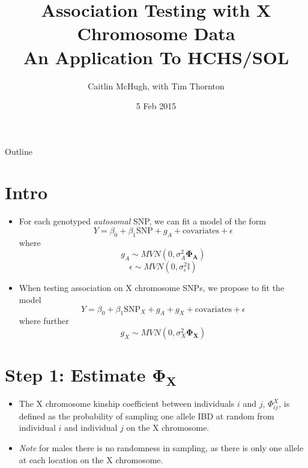 \documentclass{beamer}
\title[Association Testing with X Chromosome Data] %
{Association Testing with X Chromosome Data\\
An Application To HCHS/SOL}
\author[Caitlin McHugh, with Tim Thornton] %
{Caitlin McHugh, with Tim Thornton}
\institute[University of Washington] %
{
  Department of Biostatistics\\
  University of Washington
}
\date[Short Occasion] %
{5 Feb 2015}
\begin{document}
\begin{frame}
  \titlepage
\end{frame}

\begin{frame}{Outline}
 \tableofcontents
\end{frame}


\section{Intro}
\begin{frame}%
\begin{itemize}
\item For each genotyped \textit{autosomal} SNP, we can fit a model of the form
$$ Y = \beta_0 + \beta_1 \mbox{SNP} + g_A + \mbox{covariates} +\epsilon$$ where
$$ g_A \sim MVN(0,\sigma_A^2 \mathbf{\Phi_A})$$
$$ \epsilon \sim MVN(0,\sigma_\epsilon^2 \mathbb{I})$$
\item When testing association on X chromosome SNPs, we propose to fit the model
$$ Y = \beta_0 + \beta_1 \mbox{SNP}_X + g_A + g_X + \mbox{covariates} +\epsilon$$ where further
$$ g_X \sim MVN(0,\sigma_X^2 \mathbf{\Phi_X})$$
\end{itemize}
\end{frame}

\section{Step 1: Estimate $\mathbf{\Phi_X}$}
\begin{frame}
\begin{itemize}
\item The X chromosome kinship coefficient between individuals $i$ and $j$, $\Phi^X_{ij}$,  is defined as the probability of sampling one allele IBD at random from individual $i$ and individual $j$ on the X chromosome.
\item \textit{Note} for males there is no randomness in sampling, as there is only one allele at each location on the X chromosome.
\end{itemize}
\end{frame}
\end{document}
